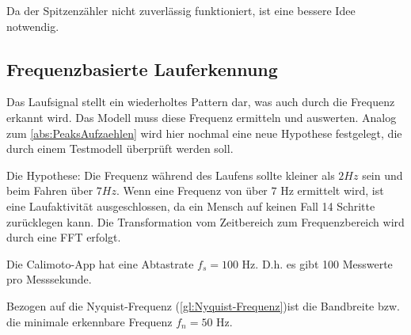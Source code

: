 

Da der Spitzenzähler nicht zuverlässig funktioniert, ist eine bessere Idee notwendig. 


\subsection{Frequenzbasierte Lauferkennung} %

Das Laufsignal stellt ein wiederholtes Pattern dar, was auch durch die Frequenz erkannt wird.
Das Modell muss diese Frequenz ermitteln und auswerten.
Analog zum \autoref{abs:PeaksAufzaehlen} wird hier nochmal eine neue Hypothese festgelegt, die durch einem Testmodell überprüft werden soll.

Die Hypothese: Die Frequenz während des Laufens sollte kleiner als $2 Hz$ sein und beim Fahren über $7 Hz$. Wenn eine Frequenz von über $7$ Hz ermittelt wird, ist eine Laufaktivität ausgeschlossen, da ein Mensch auf keinen Fall 14 Schritte zurücklegen kann. Die Transformation vom Zeitbereich zum Frequenzbereich wird durch eine FFT erfolgt.

Die Calimoto-App hat eine Abtastrate $f_s = 100$ Hz. D.h. es gibt 100 Messwerte pro Messsekunde.

Bezogen auf die Nyquist-Frequenz (\autoref{gl:Nyquist-Frequenz})ist die Bandbreite bzw. die minimale erkennbare Frequenz $f_n = 50$ Hz.

